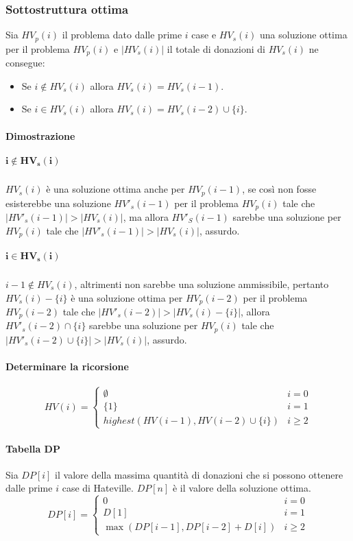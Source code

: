 		\subsubsection{Sottostruttura ottima}
			Sia $HV_p(i)$ il problema dato dalle prime $i$ case e $HV_s(i)$ una soluzione ottima per il problema $HV_p(i)$ e $|HV_s(i)|$ il totale di donazioni di $HV_s(i)$ ne consegue:
			\begin{itemize}
			\item Se $i\not\in HV_s(i)$ allora $HV_s(i) = HV_s(i-1)$.
			\item Se $i\in HV_s(i)$ allora $HV_s(i) = HV_s(i-2)\cup\{i\}$.
			\end{itemize}
			\paragraph{Dimostrazione}
			\subparagraph{$\mathbf{i\not\in HV_s(i)}$}
			$HV_s(i)$ \`e una soluzione ottima anche per $HV_p(i-1)$, se cos\`i non fosse esisterebbe una soluzione $HV'_s(i-1)$ per il problema $HV_p(i)$ tale che $|HV'_s(i-1)|>|HV_s(i)|$, ma allora $HV'_S(i-1)$ sarebbe 
			una soluzione per $HV_p(i)$ tale che $|HV'_s(i-1)|>|HV_s(i)|$, assurdo.
			\subparagraph{$\mathbf{i\in HV_s(i)}$}
			$i-1\not\in HV_s(i)$, altrimenti non sarebbe una soluzione ammissibile, pertanto $HV_s(i)-\{i\}$ \`e una soluzione ottima per $HV_p(i-2)$ per il problema $HV_p(i-2)$ tale che $|HV'_s(i-2)|>|HV_s(i)-\{i\}|$, allora
			$HV'_s(i-2)\cap\{i\}$ sarebbe una soluzione per $HV_p(i)$ tale che $|HV'_s(i-2)\cup\{i\}|>|HV_s(i)|$, assurdo.
			\paragraph{Determinare la ricorsione}
			$$
			HV(i)=
			\begin{cases}
			\emptyset\quad& i=0\\
			\{1\} & i=1\\
			highest(HV(i-1), HV(i-2)\cup\{i\}) & i\ge 2
			\end{cases}
			$$
			\paragraph{Tabella DP}
			Sia $DP[i]$ il valore della massima quantit\`a di donazioni che si possono ottenere dalle prime $i$ case di Hateville. $DP[n]$ \`e il valore della soluzione ottima.
			$$
			DP[i]=
			\begin{cases}
			0 \quad& i=0\\
			D[1] & i=1\\
			\max(DP[i-1], DP[i-2]+D[i]) & i\ge 2
			\end{cases}
			$$
